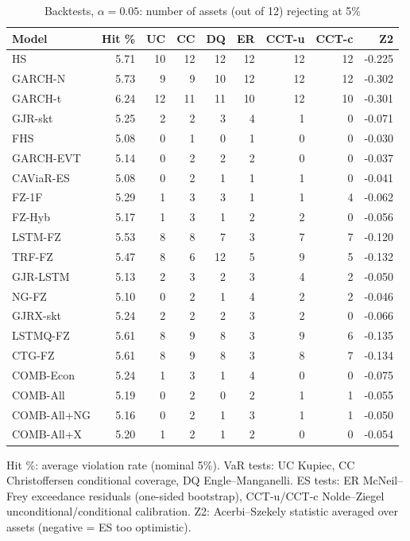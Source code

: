 \begin{table}[htbp]
\centering
\footnotesize
\caption{Backtests, $\alpha=0.05$: number of assets (out of 12) rejecting at 5\%}
\label{tab:bt_a050}
\begin{tabular}{lrrrrrrrr}
\toprule
Model & Hit \% & UC & CC & DQ & ER & CCT-u & CCT-c & Z2 \\
\midrule
HS & 5.71 & 10 & 12 & 12 & 12 & 12 & 12 & -0.225 \\
GARCH-N & 5.73 & 9 & 9 & 10 & 12 & 12 & 12 & -0.302 \\
GARCH-t & 6.24 & 12 & 11 & 11 & 10 & 12 & 10 & -0.301 \\
GJR-skt & 5.25 & 2 & 2 & 3 & 4 & 1 & 0 & -0.071 \\
FHS & 5.08 & 0 & 1 & 0 & 1 & 0 & 0 & -0.030 \\
GARCH-EVT & 5.14 & 0 & 2 & 2 & 2 & 0 & 0 & -0.037 \\
CAViaR-ES & 5.08 & 0 & 2 & 1 & 1 & 1 & 0 & -0.041 \\
FZ-1F & 5.29 & 1 & 3 & 3 & 1 & 1 & 4 & -0.062 \\
FZ-Hyb & 5.17 & 1 & 3 & 1 & 2 & 2 & 0 & -0.056 \\
LSTM-FZ & 5.53 & 8 & 8 & 7 & 3 & 7 & 7 & -0.120 \\
TRF-FZ & 5.47 & 8 & 6 & 12 & 5 & 9 & 5 & -0.132 \\
GJR-LSTM & 5.13 & 2 & 3 & 2 & 3 & 4 & 2 & -0.050 \\
NG-FZ & 5.10 & 0 & 2 & 1 & 4 & 2 & 2 & -0.046 \\
GJRX-skt & 5.24 & 2 & 2 & 2 & 3 & 2 & 0 & -0.066 \\
LSTMQ-FZ & 5.61 & 8 & 9 & 8 & 3 & 9 & 6 & -0.135 \\
CTG-FZ & 5.61 & 8 & 9 & 8 & 3 & 8 & 7 & -0.134 \\
COMB-Econ & 5.24 & 1 & 3 & 1 & 4 & 0 & 0 & -0.075 \\
COMB-All & 5.19 & 0 & 2 & 0 & 2 & 1 & 1 & -0.055 \\
COMB-All+NG & 5.16 & 0 & 2 & 1 & 3 & 1 & 1 & -0.050 \\
COMB-All+X & 5.20 & 1 & 2 & 1 & 2 & 0 & 0 & -0.054 \\
\bottomrule
\end{tabular}
\par\smallskip\parbox{\linewidth}{\scriptsize Hit \%: average violation rate (nominal 5\%). VaR tests: UC Kupiec, CC Christoffersen conditional coverage, DQ Engle--Manganelli. ES tests: ER McNeil--Frey exceedance residuals (one-sided bootstrap), CCT-u/CCT-c Nolde--Ziegel unconditional/conditional calibration. Z2: Acerbi--Szekely statistic averaged over assets (negative = ES too optimistic).}
\end{table}